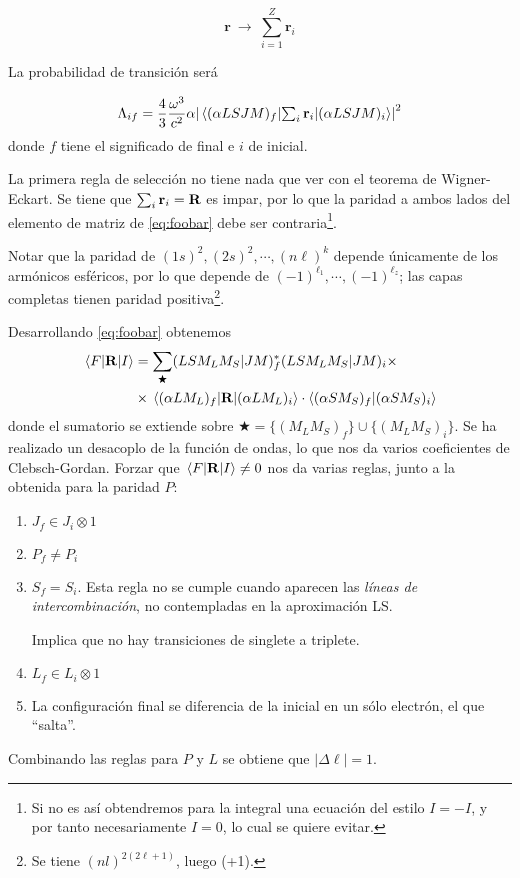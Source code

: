 \begin{equation}
  \mathbf{r} \ \rightarrow \ \sum_{i=1}^Z \mathbf{r}_i
\end{equation}

La probabilidad de transición será

\begin{equation}
  \Lambda_{if} = \frac{4}{3}\frac{\omega^3}{c^2}\alpha
  \abs{\matrixel{ (\alpha LSJM)_f}{\textstyle \sum_{i}\mathbf{r}_i}{(\alpha LSJM)_i}
}^2
 \label{eq:foobar}
\end{equation}
donde $f$ tiene el significado de final e $i$ de inicial. 

La primera regla de selección no tiene nada que ver con el teorema de
Wigner-Eckart. Se tiene que $\sum_{i}\mathbf{r}_i=\bm{\mathrm{R}}$ es impar, por lo que la
paridad a ambos lados del elemento de matriz de \eqref{eq:foobar} debe ser
contraria\footnote{Si no es así obtendremos para la integral una
  ecuación del estilo $I=-I$, y por tanto necesariamente $I=0$, lo
  cual se quiere evitar.}.

Notar que la paridad de $(1s)^2,(2s)^2,\cdots,(n\ell)^k$ depende
únicamente de los armónicos esféricos, por lo que depende de
$(-1)^{\ell_1},\cdots,(-1)^{\ell_z}$; las capas completas tienen
paridad positiva\footnote{
  Se tiene $(nl)^{2(2\ell+1)}$, luego (+1).
}.

Desarrollando \eqref{eq:foobar} obtenemos
\begin{equation}
  \begin{split}
    \mel{F}{\bm{\mathrm{R}}}{I} &= \sum_{\bigstar}
    (LSM_LM_S|JM)_f^*(LSM_LM_S|JM)_i \times \\
    &\times \mel{(\alpha L M_L)_f}{\bm{\mathrm{R}}}{(\alpha L M_L)_i} \cdot
    \braket{(\alpha S M_S)_f}{(\alpha S M_S)_i}
  \end{split}
\end{equation}
donde el sumatorio se extiende sobre $\bigstar =
\{(M_LM_S)_f\}\cup\{(M_LM_S)_i\}$. Se ha realizado un desacoplo de la
función de ondas, lo que nos da varios coeficientes de Clebsch-Gordan.
Forzar que $\mel{F}{\bm{\mathrm{R}}}{I}\neq 0$ nos da varias reglas, junto
a la obtenida para la paridad $P$:
\begin{mdframed}
\begin{enumerate}
\item $J_f\in J_i\otimes 1$
\item $P_f \neq P_i$
\item $S_f = S_i$. Esta regla no se cumple cuando aparecen las \emph{líneas
  de intercombinación}, no contempladas en la aproximación LS. 

Implica
que no hay transiciones de singlete a triplete.
\item $L_f\in L_i\otimes 1$
\item La configuración final se diferencia de la inicial en un sólo
  electrón, el que ``salta''.
\end{enumerate}
\end{mdframed}

Combinando las reglas para $P$ y $L$ se obtiene que $|\Delta\ell|=1$.

